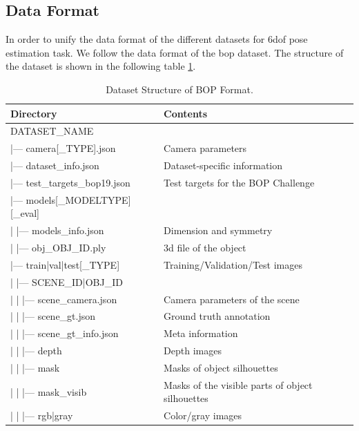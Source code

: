 \documentclass[12pt,DIV14,BCOR12mm,a4paper,footinclude=false,headinclude,parskip=half-,twoside,openright,cleardoublepage=empty,toc=index,bibliography=totoc,listof=totoc]{scrreprt}
\numberwithin{equation}{chapter}
\begin{document}
\subsection{Data Format}
In order to unify the data format of the different datasets for \gls{6dof} pose estimation task. We follow the data format of the \gls{bop} dataset. The structure of the dataset is shown in the following table \ref{tab:dataset}.
\begin{table}[ht]
  \centering
  \caption{Dataset Structure of BOP Format.}
  \label{tab:dataset}
  \begin{tabular}{l l}
      \toprule
      Directory & Contents \\
      \midrule
      DATASET\_NAME & \\
      |--- camera[\_TYPE].json & Camera parameters\\
      |--- dataset\_info.json & Dataset-specific information\\
      |--- test\_targets\_bop19.json & Test targets for the BOP Challenge \\
      |--- models[\_MODELTYPE][\_eval] & \\
      | \quad |--- models\_info.json & Dimension and symmetry\\
      | \quad |--- obj\_OBJ\_ID.ply & \gls{3d} file of the object\\
      |--- train|val|test[\_TYPE] & Training/Validation/Test images\\
      | \quad |--- SCENE\_ID|OBJ\_ID & \\
      | \quad | \quad |--- scene\_camera.json & Camera parameters of the scene\\
      | \quad | \quad |--- scene\_gt.json & Ground truth annotation\\
      | \quad | \quad |--- scene\_gt\_info.json & Meta information\\
      | \quad | \quad |--- depth & Depth images\\
      | \quad | \quad |--- mask & Masks of object silhouettes\\
      | \quad | \quad |--- mask\_visib & Masks of the visible parts of object silhouettes\\
      | \quad | \quad |--- rgb|gray & Color/gray images\\
      \bottomrule
  \end{tabular}
\end{table}
\end{document}
